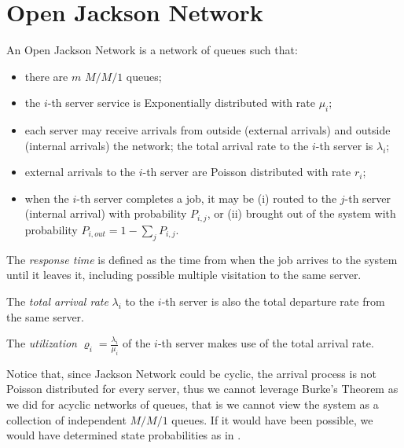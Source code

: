 \section{Open Jackson Network}
\label{sec:Open-Jackson-Networks}

\begin{definition}
\label{def:Open-Jackson-Network}
	An Open Jackson Network is a network of queues such that:
	
	\begin{itemize}
		\item there are $m$ $M/M/1$ queues;
		\item the $i$-th server service is Exponentially distributed with rate $\mu_{i}$;
		\item each server may receive arrivals from outside (external arrivals) and outside (internal arrivals) the network; the total arrival rate to the $i$-th server is $\lambda_{i}$;
		\item external arrivals to the $i$-th server are Poisson distributed with rate $r_{i}$;
		\item when the $i$-th server completes a job, it may be 
		(i) routed to the $j$-th server (internal arrival) with probability $P_{i,j}$, or 
		(ii) brought out of the system with probability $P_{i,out}=1-\sum_{j}P_{i,j}$.
	\end{itemize}
\end{definition}


The \textit{response time} is defined as the time from when the job arrives to the system until it leaves it, including possible multiple visitation to the same server.

The \textit{total arrival rate} $\lambda_{i}$ to the $i$-th server is also the total departure rate from the same server.

The \textit{utilization} $\varrho_{i} = \frac{\lambda_{i}}{\mu_{i}}$ of the $i$-th server makes use of the total arrival rate.

Notice that, since Jackson Network could be cyclic, the arrival process is not Poisson distributed for every server, thus we cannot leverage Burke's Theorem as we did for acyclic networks of queues, that is we cannot view the system as a collection of independent $M/M/1$ queues.
If it would have been possible, we would have determined state probabilities as in .

